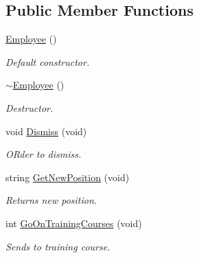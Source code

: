\subsection*{Public Member Functions}
\begin{DoxyCompactItemize}
\item 
\mbox{\label{class_employee_a003c7bd08c40924e381eb0750cbb906f}} 
\hyperlink{class_employee_a003c7bd08c40924e381eb0750cbb906f}{Employee} ()
\begin{DoxyCompactList}\small\item\em Default constructor. \end{DoxyCompactList}\item 
\mbox{\label{class_employee_abed56e9c007fff2bfe27ca87251baaf2}} 
\hyperlink{class_employee_abed56e9c007fff2bfe27ca87251baaf2}{$\sim$\+Employee} ()
\begin{DoxyCompactList}\small\item\em Destructor. \end{DoxyCompactList}\item 
\mbox{\label{class_employee_a0bec05aa09e9a7a12e3c3de49c43c158}} 
void \hyperlink{class_employee_a0bec05aa09e9a7a12e3c3de49c43c158}{Dismiss} (void)
\begin{DoxyCompactList}\small\item\em O\+Rder to dismiss. \end{DoxyCompactList}\item 
\mbox{\label{class_employee_ae210ea3433b4596f9d3ff5dee4c63bc2}} 
string \hyperlink{class_employee_ae210ea3433b4596f9d3ff5dee4c63bc2}{Get\+New\+Position} (void)
\begin{DoxyCompactList}\small\item\em Returns new position. \end{DoxyCompactList}\item 
\mbox{\label{class_employee_a8644c276b8a3cdb8bb62a71a492e574d}} 
int \hyperlink{class_employee_a8644c276b8a3cdb8bb62a71a492e574d}{Go\+On\+Training\+Courses} (void)
\begin{DoxyCompactList}\small\item\em Sends to training course. \end{DoxyCompactList}\item 

\end{DoxyCompactItemize}
